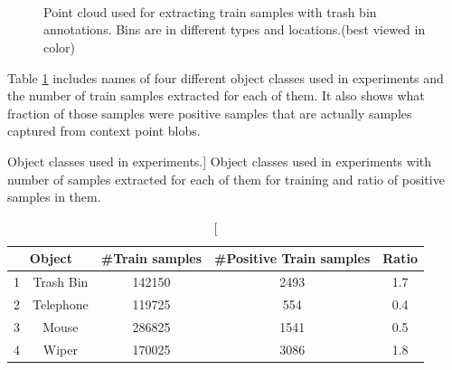 \begin{figure} [htp]
   \begin{center}
     \\
     \\
     \\
  \end{center}
  \caption[Train set point-clouds]
  {Point cloud used for extracting train samples with trash bin annotations. Bins are in different types and locations.(best viewed in color)}
  \label{TrainClouds1.figure:edge}
\end{figure}

Table \ref{Objects.table} includes names of four different object classes used in experiments and the number of train samples extracted for each of them.
It also shows what fraction of those samples were positive samples that are actually samples captured from context point blobs.


\begin{table}
\centering
\caption
[Object classes used in experiments.]
{Object classes used in experiments with number of samples extracted for each of them for training and ratio of positive samples in them.}
\label{Objects.table}
\begin{tabular}{|c|c|c|c|c|}
\hline
\multicolumn{2}{|c|}{Object} & \#Train samples & \#Positive Train samples & Ratio \\
\hline
      1 & Trash Bin & 142150 & 2493 & 1.7 \\
\hline
      2 & Telephone   & 119725 & 554  & 0.4 \\
\hline
      3 & Mouse     & 286825 & 1541 & 0.5 \\
\hline
      4 & Wiper     & 170025 & 3086 & 1.8 \\
\hline

\end{tabular}
\end{table}


